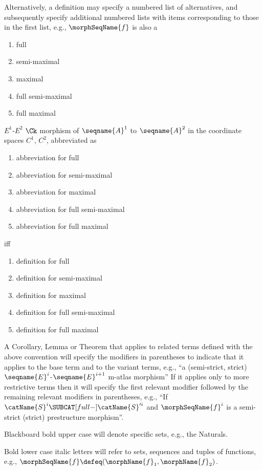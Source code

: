 \documentclass{article}
\begin{document}
Alternatively, a definition may specify a numbered list of alternatives,
and subsequently specify additional numbered lists with items
corresponding to those in the first list, e.g.,
$\morphSeqName{f}$ is also a
\begin{enumerate}
\item full
\item semi-maximal
\item maximal
\item full semi-maximal
\item full maximal
\end{enumerate}
$E^1$-$E^2$ $\Ck$ morphism of
$\seqname{A}^1$ to $\seqname{A}^2$ in the coordinate spaces $C^1$,
$C^2$, abbreviated as
\begin{enumerate}
\item abbreviation for full
\item abbreviation for semi-maximal
\item abbreviation for maximal
\item abbreviation for full semi-maximal
\item abbreviation for full maximal
\end{enumerate}
iff
\begin{enumerate}
\item definition for full
\item definition for semi-maximal
\item definition for maximal
\item definition for full semi-maximal
\item definition for full maximal
\end{enumerate}

A Corollary, Lemma or Theorem that applies to related terms defined
with the above convention will specify the modifiers in parentheses
to indicate that it applies to the base term and to the variant
terms, e.g., {\textquotedblleft}a (semi-strict, strict)
$\seqname{E}^i$-$\seqname{E}^{i+1}$ m-atlas morphism{\textquotedblright}
If it applies only to more restrictive terms then it will specify the
first relevant modifier followed by the remaining relevant modifiers in
parentheses, e.g., {\textquotedblleft}If
$\catName{S}^i \SUBCAT[full-] \catName{S}'^i$ and $\morphSeqName{f}^i$ is
a semi-strict (strict) prestructure morphism{\textquotedblright}.

Blackboard bold upper case will denote specific sets, e.g., the
Naturals.

Bold lower case italic letters will refer to sets, sequences and tuples
of functions, e.g.,
$\morphSeqName{f} \defeq (\morphName{f}_1, \morphName{f}_2)$.
\end{document}
